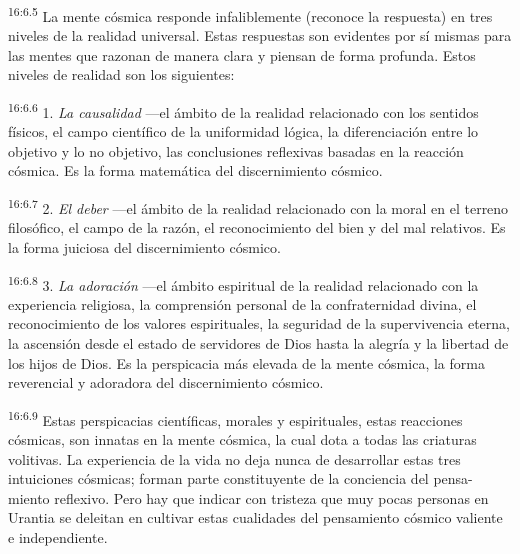 \par
\textsuperscript{16:6.5} La mente cósmica responde infaliblemente (reconoce la respuesta) en tres niveles de la realidad universal. Estas respuestas son evidentes por sí mismas para las mentes que razonan de manera clara y piensan de forma profunda. Estos niveles de realidad son los siguientes:

\par
\textsuperscript{16:6.6} 1. \textit{La causalidad} ---el ámbito de la realidad relacionado con los sentidos físicos, el campo científico de la uniformidad lógica, la diferenciación entre lo objetivo y lo no objetivo, las conclusiones reflexivas basadas en la reacción cósmica. Es la forma matemática del discernimiento cósmico.

\par
\textsuperscript{16:6.7} 2. \textit{El deber} ---el ámbito de la realidad relacionado con la moral en el terreno filosófico, el campo de la razón, el reconocimiento del bien y del mal relativos. Es la forma juiciosa del discernimiento cósmico.

\par
\textsuperscript{16:6.8} 3. \textit{La adoración} ---el ámbito espiritual de la realidad relacionado con la experiencia religiosa, la comprensión personal de la confraternidad divina, el reconocimiento de los valores espirituales, la seguridad de la supervivencia eterna, la ascensión desde el estado de servidores de Dios hasta la alegría y la libertad de los hijos de Dios. Es la perspicacia más elevada de la mente cósmica, la forma reverencial y adoradora del discernimiento cósmico.

\par
\textsuperscript{16:6.9} Estas perspicacias científicas, morales y espirituales, estas reacciones cósmicas, son innatas en la mente cósmica, la cual dota a todas las criaturas volitivas. La experiencia de la vida no deja nunca de desarrollar estas tres intuiciones cósmicas; forman parte constituyente de la conciencia del pensa-miento reflexivo. Pero hay que indicar con tristeza que muy pocas personas en Urantia se deleitan en cultivar estas cualidades del pensamiento cósmico valiente e independiente.

